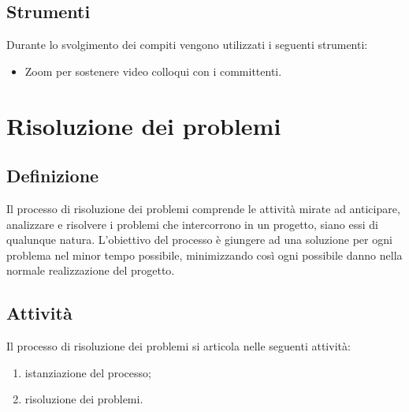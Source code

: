 \subsection{Strumenti}
Durante lo svolgimento dei compiti vengono utilizzati i seguenti strumenti:
\begin{itemize}
    \item Zoom per sostenere video colloqui con i committenti.
\end{itemize}
\newpage

\section{Risoluzione dei problemi} \label{sec:risoprob}
\subsection{Definizione}
Il processo di risoluzione dei problemi comprende le attività mirate ad anticipare, analizzare e risolvere i problemi che intercorrono in un progetto, siano essi di qualunque natura. L'obiettivo del processo è giungere ad una soluzione per ogni problema nel minor tempo possibile, minimizzando così ogni possibile danno nella normale realizzazione del progetto.
\subsection{Attività}
Il processo di risoluzione dei problemi si articola nelle seguenti attività:
\begin{enumerate}
    \item istanziazione del processo;
    \item risoluzione dei problemi.
\end{enumerate}
